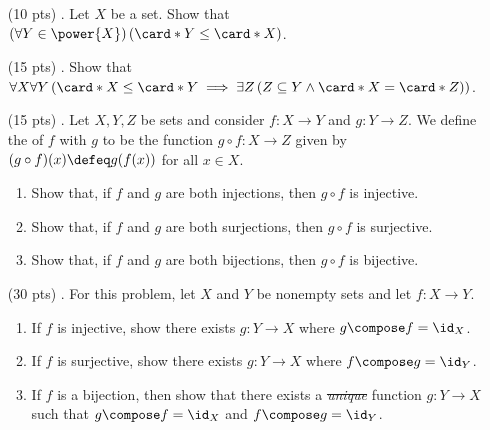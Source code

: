 \begin{enumerate}
  \item[(10 pts) \quad 1.]
    Let $X$ be a set.
    Show that $\left(\forall Y \in \power{X}\right)\left(\card*{Y} \leq \card*{X}\right)$.

  \item[(15 pts) \quad 2.]
    Show that $\forall X \forall Y \left(\card*{X} \leq  \card*{Y} \implies \exists Z \left(Z \subseteq Y \land \card*{X} = \card*{Z}\right)\right)$.

  \item[(15 pts) \quad 3.]
    Let $X, Y, Z$ be sets and consider
    $f: X \to Y$ and $g: Y \to Z$.%
    We define the  of $f$ with $g$ to be the function
    $g \circ f: X \to Z$ given by
    $(g \circ f)(x) \defeq g(f(x))$
    for all $x \in X$.
    \begin{enumerate}
      \item
        Show that, if $f$ and $g$ are both injections, then $g \circ f$ is injective.%
      \item
        Show that, if $f$ and $g$ are both surjections, then $g \circ f$ is surjective.%
      \item
        Show that, if $f$ and $g$ are both bijections, then $g \circ f$ is bijective.
    \end{enumerate}

  \item[(30 pts) \quad 4.]
    For this problem, let $X$ and $Y$ be nonempty sets and let $f: X \to Y$.
    \begin{enumerate}
      \item
        If $f$ is injective, show there exists $g: Y \to X$ where $g \compose f = \id_X$.
      \item
        If $f$ is surjective, show there exists $g: Y \to X$ where $f \compose g = \id_Y$.
      \item
        If $f$ is a bijection, then show that there exists a \sout{\emph{unique}} function $g: Y \to X$ such that $g \compose f = \id_X$ and $f \compose g = \id_Y$.
    \end{enumerate}


\end{enumerate}
